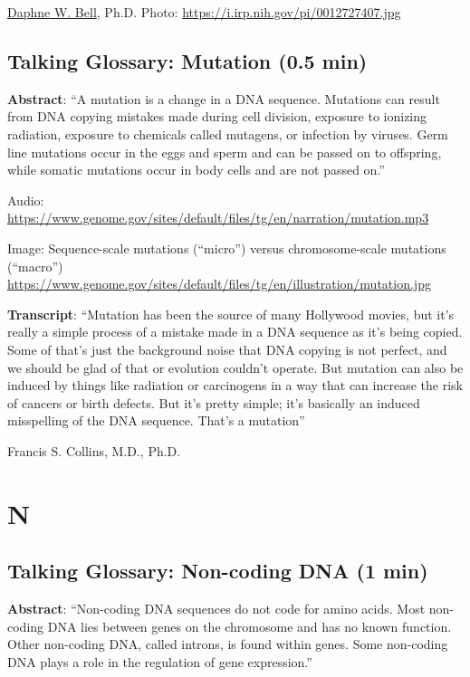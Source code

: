 \documentclass[
]{book}
\begin{document}
\href{https://irp.nih.gov/pi/daphne-bell}{Daphne W. Bell}, Ph.D.
Photo: \url{https://i.irp.nih.gov/pi/0012727407.jpg}

\hypertarget{talking-glossary-mutation-0.5-min}{%
\section{Talking Glossary: Mutation (0.5 min)}\label{talking-glossary-mutation-0.5-min}}

\textbf{Abstract}: ``A mutation is a change in a DNA sequence. Mutations can result from DNA copying mistakes made during cell division, exposure to ionizing radiation, exposure to chemicals called mutagens, or infection by viruses. Germ line mutations occur in the eggs and sperm and can be passed on to offspring, while somatic mutations occur in body cells and are not passed on.''

Audio: \url{https://www.genome.gov/sites/default/files/tg/en/narration/mutation.mp3}

Image: Sequence-scale mutations (``micro'') versus chromosome-scale mutations (``macro'')
\url{https://www.genome.gov/sites/default/files/tg/en/illustration/mutation.jpg}

\textbf{Transcript}: ``Mutation has been the source of many Hollywood movies, but it's really a simple process of a mistake made in a DNA sequence as it's being copied. Some of that's just the background noise that DNA copying is not perfect, and we should be glad of that or evolution couldn't operate. But mutation can also be induced by things like radiation or carcinogens in a way that can increase the risk of cancers or birth defects. But it's pretty simple; it's basically an induced misspelling of the DNA sequence. That's a mutation''

Francis S. Collins, M.D., Ph.D.

\hypertarget{n}{%
\chapter{N}\label{n}}

\hypertarget{talking-glossary-non-coding-dna-1-min}{%
\section{Talking Glossary: Non-coding DNA (1 min)}\label{talking-glossary-non-coding-dna-1-min}}

\textbf{Abstract}: ``Non-coding DNA sequences do not code for amino acids. Most non-coding DNA lies between genes on the chromosome and has no known function. Other non-coding DNA, called introns, is found within genes. Some non-coding DNA plays a role in the regulation of gene expression.''
\end{document}
